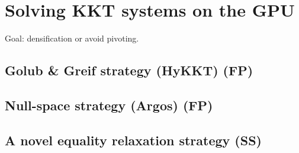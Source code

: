 \section{Solving KKT systems on the GPU}
Goal: densification or avoid pivoting.
\subsection{Golub \& Greif strategy (HyKKT) (FP)}
\subsection{Null-space strategy (Argos) (FP)}
\subsection{A novel equality relaxation strategy (SS)}
